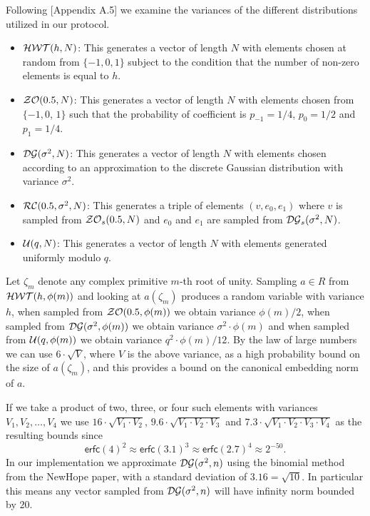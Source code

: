 Following \cite{GHS12c}[Appendix A.5] we examine the variances
of the different distributions utilized in our protocol.
\begin{itemize}
\item $\mathcal{HWT}(h,N)$: This generates a vector of length $N$
      with elements chosen at random from $\{-1,0,1\}$ subject to
      the condition that the number of non-zero elements is equal to $h$.
\item $\mathcal{ZO}(0.5,N)$:  This generates a vector of length $N$
      with elements chosen from $\{-1,0$, $1\}$ such that the
      probability of coefficient is $p_{-1}=1/4$, $p_0=1/2$
      and $p_1=1/4$.
\item $\mathcal{DG}(\sigma^2,N)$: This generates a vector of
      length $N$ with elements chosen according to an approximation to
      the discrete Gaussian distribution with variance $\sigma^2$.
\item $\mathcal{RC}(0.5,\sigma^2,N)$: This generates a triple of
      elements $(v,e_0,e_1)$ where $v$ is sampled from $\mathcal{ZO}_s(0.5,N)$
      and $e_0$ and $e_1$ are sampled from $\mathcal{DG}_s(\sigma^2,N)$.
\item $\mathcal{U}(q,N)$: This generates a vector of length $N$ 
      with elements generated uniformly modulo $q$.
\end{itemize}
Let $\zeta_m$ denote any complex primitive $m$-th root of unity.
Sampling $a \in R$ from $\mathcal{HWT}(h,\phi(m))$ and looking at $a(\zeta_m)$
produces a random variable with variance $h$, when sampled
from $\mathcal{ZO}(0.5,\phi(m))$ we obtain variance $\phi(m)/2$,
when sampled from $\mathcal{DG}(\sigma^2,\phi(m))$ we obtain variance
$\sigma^2 \cdot \phi(m)$ and when sampled from $\mathcal{U}(q,\phi(m))$
we obtain variance $q^2 \cdot \phi(m)/12$.
By the law of large numbers we can use $6 \cdot \sqrt{V}$,
where $V$ is the above variance, as a high probability bound
on the size of $a(\zeta_m)$, and this provides a bound on the
canonical embedding norm of $a$.

If we take a product of two, three, or four such
elements with variances $V_1, V_2, \ldots, V_4$ we use
$16 \cdot \sqrt{V_1 \cdot V_2}$,
$9.6 \cdot \sqrt{V_1 \cdot V_2 \cdot V_3}$ and
$7.3 \cdot \sqrt{V_1 \cdot V_2 \cdot V_3 \cdot V_4}$
as the resulting bounds since 
\[  \mathsf{erfc}(4)^2  \approx \mathsf{erfc}(3.1)^3 
    \approx  \mathsf{erfc}(2.7)^4 \approx  2^{-50}. \]
In our implementation we approximate $\mathcal{DG}(\sigma^2,n)$ using
the binomial method from the NewHope paper, with a standard
deviation of $3.16 = \sqrt{10}$. In particular this means
any vector sampled from $\mathcal{DG}(\sigma^2,n)$ will have
infinity norm bounded by $20$.


